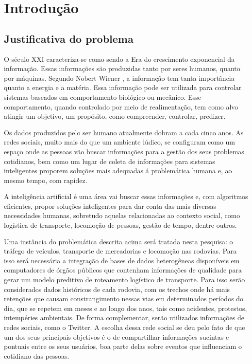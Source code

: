 \chapter{Introdução}\label{intro}

\section{Justificativa do problema}\label{intro:problem}

O século XXI caracteriza-se como sendo a Era do crescimento exponencial da informação. Essas informações são produzidas tanto por seres humanos, quanto por máquinas. Segundo Nobert Wiener \cite{Salles2007}, a informação tem tanta importância quanto a energia e a matéria. Essa informação pode ser utilizada para controlar sistemas baseados em comportamento biológico ou mecânico. Esse comportamento, quando controlado por meio de realimentação, tem como alvo atingir um objetivo, um propósito, como compreender, controlar, predizer.

Os dados produzidos pelo ser humano atualmente dobram a cada cinco anos. As redes sociais, muito mais do que um ambiente lúdico, se configuram como um espaço onde as pessoas vão buscar informações para a gestão dos seus problemas cotidianos, bem como um lugar de coleta de informações para sistemas inteligentes proporem soluções mais adequadas á problemática humana e, ao mesmo tempo, com rapidez.

A inteligência artificial é uma área vai buscar essas informações e, com algoritmos eficientes, propor soluções inteligentes para dar conta das mais diversas necessidades humanas, sobretudo aquelas relacionadas ao contexto social, como logística de transporte, locomoção de pessoas, gestão de tempo, dentre outros.
 
Uma instância do problemática descrita acima será tratada nesta pesquisa: o tráfego de veículos, transporte de mercadorias e locomoção nas rodovias.  Para isso será necessária a integração de bases de dados heterogêneas disponíveis em computadores de órgãos públicos 
que contenham informações de qualidade para gerar um modelo preditivo de roteamento logístico de transporte. Para isso serão considerados dados históricos de cada rodovia, com os trechos onde há mais 
retenções que causam constrangimento nessas vias em determinados períodos do dia, que se repetem em meses e ao longo dos anos, tais como acidentes, protestos, intempéries ambientais.
De forma complementar, serão utilizados informações de redes sociais, como o Twitter. A escolha dessa rede social se deu pelo fato de que um dos seus principais objetivos é o de compartilhar informações sucintas e pontuais entre os seus usuários, boa parte delas sobre eventos que influenciam o cotidiano das pessoas.

